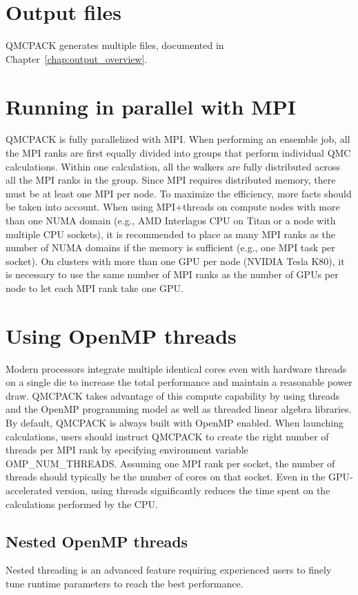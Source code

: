 \section{Output files}
QMCPACK generates multiple files, documented in Chapter~\ref{chap:output_overview}.

\section{Running in parallel with MPI}
\label{sec:parallelrunning}

QMCPACK is fully parallelized with MPI. When performing an ensemble job, all
the MPI ranks are first equally divided into groups that perform individual
QMC calculations. Within one calculation, all the walkers are fully distributed
across all the MPI ranks in the group. Since MPI requires distributed memory,
there must be at least one MPI per node. To maximize the efficiency, more facts
should be taken into account. When using MPI+threads on compute nodes with more
than one NUMA domain (e.g., AMD Interlagos CPU on Titan or a node with multiple
CPU sockets), it is recommended to place as many MPI ranks as the number of
NUMA domains if the memory is sufficient (e.g., one MPI task per socket). On clusters with more than one
GPU per node (NVIDIA Tesla K80), it is necessary to use the same number of MPI
ranks as the number of GPUs per node to let each MPI rank take one GPU.

\section{Using OpenMP threads}
\label{sec:openmprunning}
Modern processors integrate multiple identical cores even with
hardware threads on a single die to increase the total performance and
maintain a reasonable power draw. QMCPACK takes advantage of this
compute capability by using threads and the OpenMP programming model
as well as threaded linear algebra libraries. By default, QMCPACK is
always built with OpenMP enabled. When launching calculations, users
should instruct QMCPACK to create the right number of threads per MPI
rank by specifying environment variable OMP\_NUM\_THREADS. Assuming
one MPI rank per socket, the number of threads should typically be the
number of cores on that socket. Even in the GPU-accelerated version,
using threads significantly reduces the time spent on the calculations
performed by the CPU.

\subsection{Nested OpenMP threads}
Nested threading is an advanced feature requiring experienced users to finely tune runtime parameters to reach the best performance.  

